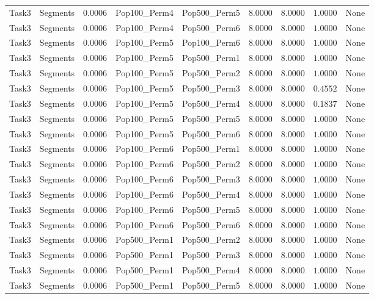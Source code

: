 \documentclass[8pt]{article}
\begin{document}
\begin{longtable}{llccccccc}
Task3 & Segments & $0.0006$ & Pop100\_Perm4 & Pop500\_Perm5 & 8.0000 & 8.0000 & $1.0000$ & None \\
Task3 & Segments & $0.0006$ & Pop100\_Perm4 & Pop500\_Perm6 & 8.0000 & 8.0000 & $1.0000$ & None \\
Task3 & Segments & $0.0006$ & Pop100\_Perm5 & Pop100\_Perm6 & 8.0000 & 8.0000 & $1.0000$ & None \\
Task3 & Segments & $0.0006$ & Pop100\_Perm5 & Pop500\_Perm1 & 8.0000 & 8.0000 & $1.0000$ & None \\
Task3 & Segments & $0.0006$ & Pop100\_Perm5 & Pop500\_Perm2 & 8.0000 & 8.0000 & $1.0000$ & None \\
Task3 & Segments & $0.0006$ & Pop100\_Perm5 & Pop500\_Perm3 & 8.0000 & 8.0000 & $0.4552$ & None \\
Task3 & Segments & $0.0006$ & Pop100\_Perm5 & Pop500\_Perm4 & 8.0000 & 8.0000 & $0.1837$ & None \\
Task3 & Segments & $0.0006$ & Pop100\_Perm5 & Pop500\_Perm5 & 8.0000 & 8.0000 & $1.0000$ & None \\
Task3 & Segments & $0.0006$ & Pop100\_Perm5 & Pop500\_Perm6 & 8.0000 & 8.0000 & $1.0000$ & None \\
Task3 & Segments & $0.0006$ & Pop100\_Perm6 & Pop500\_Perm1 & 8.0000 & 8.0000 & $1.0000$ & None \\
Task3 & Segments & $0.0006$ & Pop100\_Perm6 & Pop500\_Perm2 & 8.0000 & 8.0000 & $1.0000$ & None \\
Task3 & Segments & $0.0006$ & Pop100\_Perm6 & Pop500\_Perm3 & 8.0000 & 8.0000 & $1.0000$ & None \\
Task3 & Segments & $0.0006$ & Pop100\_Perm6 & Pop500\_Perm4 & 8.0000 & 8.0000 & $1.0000$ & None \\
Task3 & Segments & $0.0006$ & Pop100\_Perm6 & Pop500\_Perm5 & 8.0000 & 8.0000 & $1.0000$ & None \\
Task3 & Segments & $0.0006$ & Pop100\_Perm6 & Pop500\_Perm6 & 8.0000 & 8.0000 & $1.0000$ & None \\
Task3 & Segments & $0.0006$ & Pop500\_Perm1 & Pop500\_Perm2 & 8.0000 & 8.0000 & $1.0000$ & None \\
Task3 & Segments & $0.0006$ & Pop500\_Perm1 & Pop500\_Perm3 & 8.0000 & 8.0000 & $1.0000$ & None \\
Task3 & Segments & $0.0006$ & Pop500\_Perm1 & Pop500\_Perm4 & 8.0000 & 8.0000 & $1.0000$ & None \\
Task3 & Segments & $0.0006$ & Pop500\_Perm1 & Pop500\_Perm5 & 8.0000 & 8.0000 & $1.0000$ & None \\

\end{longtable}
\end{document}
